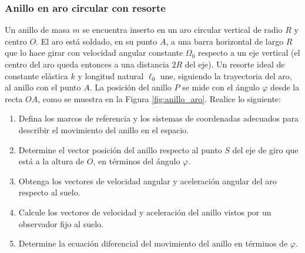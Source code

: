 \subsubsection{Anillo en aro circular con resorte}

Un anillo de masa $m$ se encuentra inserto en un aro circular vertical de radio $R$ y centro $O$. El aro está soldado, en su punto $A$, a una barra horizontal de largo $R$ que lo hace girar con velocidad angular constante $\Omega_0$ respecto a un eje vertical (el centro del aro queda entonces a una distancia $2R$ del eje). Un resorte ideal de constante elástica $k$ y longitud natural $\ell_0$ une, siguiendo la trayectoria del aro, al anillo con el punto $A$. La posición del anillo $P$ se mide con el ángulo $\varphi$ desde la recta $OA$, como se muestra en la Figura \ref{fig:anillo_aro}. Realice lo siguiente:

\begin{enumerate}
    \item Defina los marcos de referencia y los sistemas de coordenadas adecuados para describir el movimiento del anillo en el espacio.
    \item Determine el vector posición del anillo respecto al punto $S$ del eje de giro que está a la altura de $O$, en términos del ángulo $\varphi$.
    \item Obtenga los vectores de velocidad angular y aceleración angular del aro respecto al suelo.
    \item Calcule los vectores de velocidad y aceleración del anillo vistos por un observador fijo al suelo.
    \item Determine la ecuación diferencial del movimiento del anillo en términos de $\varphi$.
\end{enumerate}

